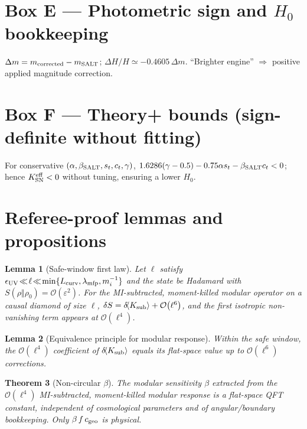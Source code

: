 \documentclass[aps,prd,preprint,onecolumn,longbibliography,nofootinbib]{revtex4-2}
\theoremstyle{plain}
\newtheorem{theorem}{Theorem}
\newtheorem{lemma}[theorem]{Lemma}
\theoremstyle{remark}
\newcommand{\Hzero}{H_0}
\newcommand{\be}{\beta}
\newcommand{\beS}{\beta_{\rm SALT}}
\newcommand{\order}[1]{\mathcal{O}\!\left(#1\right)}
\newcommand{\eps}{\varepsilon}
\begin{document}
\section*{Box E — Photometric sign and $\Hzero$ bookkeeping}
$\Delta m=m_{\rm corrected}-m_{\rm SALT}$; $\Delta H/H\simeq-0.4605\,\Delta m$. “Brighter engine” $\Rightarrow$ positive applied magnitude correction.

\section*{Box F — Theory+ bounds (sign-definite without fitting)}
For conservative $(\alpha,\beS,s_t,c_t,\gamma)$, $1.6286(\gamma-0.5)-0.75\alpha s_t-\beS c_t<0$; hence $K^{\rm eff}_{\rm SN}<0$ without tuning, ensuring a lower $\Hzero$.

\appendix

\section{Referee-proof lemmas and propositions}\label{app:lemmas}

\begin{lemma}[Safe-window first law]\label{lem:safe-window-first-law}
Let $\ell$ satisfy $\epsilon_{\rm UV}\!\ll\!\ell\!\ll\!\min\{L_{\rm curv},\lambda_{\rm mfp},m_i^{-1}\}$ and the state be Hadamard with $S(\rho\Vert\rho_0)=\order{\eps^2}$. For the MI-subtracted, moment-killed modular operator on a causal diamond of size $\ell$,
$\delta S = \delta\!\langle K_{\rm sub}\rangle + \order{\ell^{6}}$, and the first isotropic non-vanishing term appears at $\order{\ell^4}$.
\end{lemma}

\begin{lemma}[Equivalence principle for modular response]\label{lem:EPMR}
Within the safe window, the $\order{\ell^4}$ coefficient of $\delta\!\langle K_{\rm sub}\rangle$ equals its flat-space value up to $\order{\ell^6}$ corrections.
\end{lemma}

\begin{theorem}[Non-circular $\be$]\label{thm:beta-noncircular}
The modular sensitivity $\be$ extracted from the $\order{\ell^4}$ MI-subtracted, moment-killed modular response is a flat-space QFT constant, independent of cosmological parameters and of angular/boundary bookkeeping. Only $\be\,f\,c_{\rm geo}$ is physical.
\end{theorem}
\end{document}

